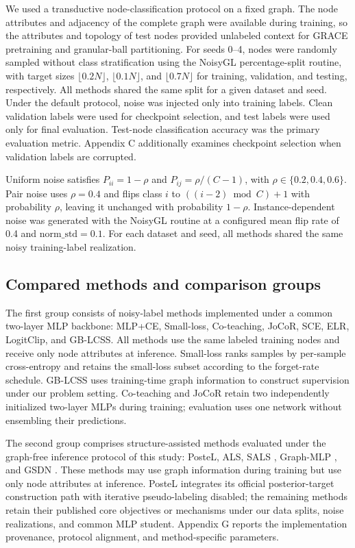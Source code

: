 \documentclass[preprint,12pt]{elsarticle}
\begin{document}
We used a transductive node-classification protocol on a fixed graph. The node attributes and adjacency of the complete graph were available during training, so the attributes and topology of test nodes provided unlabeled context for GRACE pretraining and granular-ball partitioning. For seeds 0--4, nodes were randomly sampled without class stratification using the NoisyGL percentage-split routine, with target sizes \(\lfloor 0.2N\rfloor\), \(\lfloor 0.1N\rfloor\), and \(\lfloor 0.7N\rfloor\) for training, validation, and testing, respectively. All methods shared the same split for a given dataset and seed. Under the default protocol, noise was injected only into training labels. Clean validation labels were used for checkpoint selection, and test labels were used only for final evaluation. Test-node classification accuracy was the primary evaluation metric. Appendix C additionally examines checkpoint selection when validation labels are corrupted.

Uniform noise satisfies \(P_{ii} = 1 - \rho\) and \(P_{ij} = \rho/(C - 1)\), with \(\rho \in \{ 0.2,0.4,0.6\}\). Pair noise uses \(\rho = 0.4\) and flips class \(i\) to \(((i - 2)\bmod C) + 1\) with probability \(\rho\), leaving it unchanged with probability \(1 - \rho\). Instance-dependent noise was generated with the NoisyGL routine at a configured mean flip rate of 0.4 and \(\text{norm\_std} = 0.1\). For each dataset and seed, all methods shared the same noisy training-label realization.

\subsection{Compared methods and comparison groups}\label{sec:4.3}

The first group consists of noisy-label methods implemented under a common two-layer MLP backbone: MLP+CE, Small-loss, Co-teaching, JoCoR, SCE, ELR, LogitClip, and GB-LCSS. All methods use the same labeled training nodes and receive only node attributes at inference. Small-loss ranks samples by per-sample cross-entropy and retains the small-loss subset according to the forget-rate schedule. GB-LCSS uses training-time graph information to construct supervision under our problem setting. Co-teaching and JoCoR retain two independently initialized two-layer MLPs during training; evaluation uses one network without ensembling their predictions.

The second group comprises structure-assisted methods evaluated under the graph-free inference protocol of this study: PosteL, ALS, SALS \cite{ref60,ref61,ref62}, Graph-MLP \cite{ref4}, and GSDN \cite{ref14}. These methods may use graph information during training but use only node attributes at inference. PosteL integrates its official posterior-target construction path with iterative pseudo-labeling disabled; the remaining methods retain their published core objectives or mechanisms under our data splits, noise realizations, and common MLP student. Appendix G reports the implementation provenance, protocol alignment, and method-specific parameters.
\end{document}
